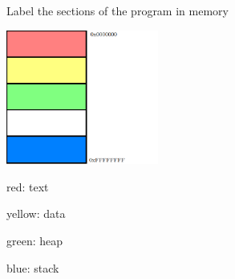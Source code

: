 Label the sections of the program in memory

\includegraphics[width=50mm]{other/programstructure.png}

\begin{answer}
red: text

yellow: data

green: heap

blue: stack
\end{answer}